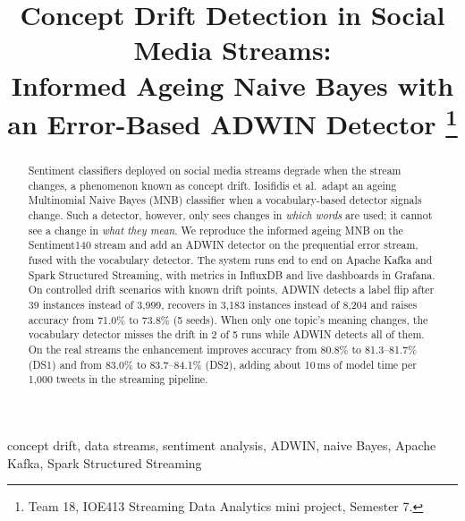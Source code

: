 \documentclass[conference]{IEEEtran}
\begin{document}
\title{Concept Drift Detection in Social Media Streams:\\
Informed Ageing Naive Bayes with an Error-Based ADWIN Detector%
\thanks{Team 18, IOE413 Streaming Data Analytics mini project, Semester 7.}}

\author{
\and
{}
\and
{}
\and
{}
}

\maketitle

\begin{abstract}
Sentiment classifiers deployed on social media streams degrade when the stream changes, a
phenomenon known as concept drift. Iosifidis et al.\ adapt an ageing Multinomial Naive Bayes
(MNB) classifier when a vocabulary-based detector signals change. Such a detector, however,
only sees changes in \emph{which words} are used; it cannot see a change in \emph{what they
mean}. We reproduce the informed ageing MNB on the Sentiment140 stream and add an ADWIN
detector on the prequential error stream, fused with the vocabulary detector. The system runs
end to end on Apache Kafka and Spark Structured Streaming, with metrics in InfluxDB and live
dashboards in Grafana. On controlled drift scenarios with known drift points, ADWIN detects a
label flip after 39 instances instead of 3{,}999, recovers in 3{,}183 instances instead of
8{,}204 and raises accuracy from 71.0\% to 73.8\% (5 seeds). When only one topic's meaning
changes, the vocabulary detector misses the drift in 2 of 5 runs while ADWIN detects all of
them. On the real streams the enhancement improves accuracy from 80.8\% to 81.3--81.7\% (DS1)
and from 83.0\% to 83.7--84.1\% (DS2), adding about 10\,ms of model time per 1{,}000 tweets
in the streaming pipeline.
\end{abstract}

\begin{IEEEkeywords}
concept drift, data streams, sentiment analysis, ADWIN, naive Bayes, Apache Kafka, Spark
Structured Streaming
\end{IEEEkeywords}
\end{document}
